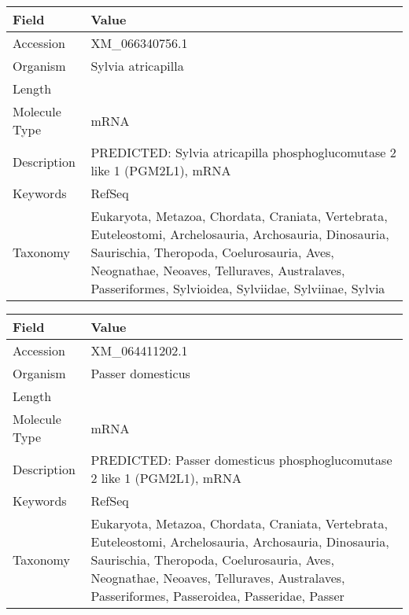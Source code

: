 \documentclass[10pt]{article}
\begin{document}
\vspace{1em}
{\footnotesize
\begin{longtable}{>{\raggedright\arraybackslash}p{4.5cm} >{\raggedright\arraybackslash}p{11.5cm}}
\textbf{Field} & \textbf{Value} \\
\hline
Accession & XM\_066340756.1 \\
Organism & Sylvia atricapilla \\
Length & 5988 \\
Molecule Type & mRNA \\
Description & PREDICTED: Sylvia atricapilla phosphoglucomutase 2 like 1 (PGM2L1), mRNA \\
Keywords & RefSeq \\
Taxonomy & Eukaryota, Metazoa, Chordata, Craniata, Vertebrata, Euteleostomi, Archelosauria, Archosauria, Dinosauria, Saurischia, Theropoda, Coelurosauria, Aves, Neognathae, Neoaves, Telluraves, Australaves, Passeriformes, Sylvioidea, Sylviidae, Sylviinae, Sylvia \\
\end{longtable}
}

\vspace{1em}
{\footnotesize
\begin{longtable}{>{\raggedright\arraybackslash}p{4.5cm} >{\raggedright\arraybackslash}p{11.5cm}}
\textbf{Field} & \textbf{Value} \\
\hline
Accession & XM\_064411202.1 \\
Organism & Passer domesticus \\
Length & 5381 \\
Molecule Type & mRNA \\
Description & PREDICTED: Passer domesticus phosphoglucomutase 2 like 1 (PGM2L1), mRNA \\
Keywords & RefSeq \\
Taxonomy & Eukaryota, Metazoa, Chordata, Craniata, Vertebrata, Euteleostomi, Archelosauria, Archosauria, Dinosauria, Saurischia, Theropoda, Coelurosauria, Aves, Neognathae, Neoaves, Telluraves, Australaves, Passeriformes, Passeroidea, Passeridae, Passer \\
\end{longtable}
}
\end{document}
